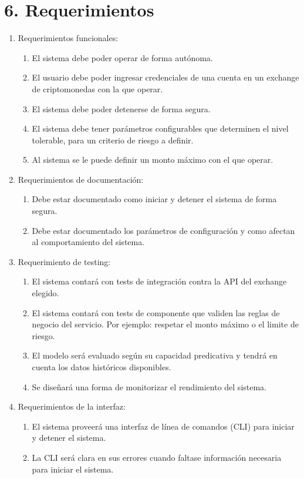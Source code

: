 \documentclass[
    11pt, %
]{charter}
\begin{document}
    \section{6. Requerimientos}
    \label{sec:requerimientos}

    \begin{enumerate}
    \item Requerimientos funcionales:
      \begin{enumerate}
      \item El sistema debe poder operar de forma autónoma.
      \item El usuario debe poder ingresar credenciales de una cuenta en un exchange de criptomonedas con la que operar.
      \item El sistema debe poder detenerse de forma segura.
      \item El sistema debe tener parámetros configurables que determinen el nivel tolerable, para un criterio de riesgo a definir.
      \item Al sistema se le puede definir un monto máximo con el que operar.
      \end{enumerate}
    \item Requerimientos de documentación:
      \begin{enumerate}
      \item Debe estar documentado como iniciar y detener el sistema de forma segura.
      \item Debe estar documentado los parámetros de configuración y como afectan al comportamiento del sistema.

      \end{enumerate}
    \item Requerimiento de testing:
      \begin{enumerate}
      \item El sistema contará con tests de integración contra la API del exchange elegido.
      \item El sistema contará con tests de componente que validen las reglas de negocio del servicio. Por ejemplo: respetar el monto máximo o el limite de riesgo.
      \item El modelo será evaluado según su capacidad predicativa y tendrá en cuenta los datos históricos disponibles.
      \item Se diseñará una forma de monitorizar el rendimiento del sistema.
      \end{enumerate}

    \item Requerimientos de la interfaz:
      \begin{enumerate}
      \item El sistema proveerá una interfaz de línea de comandos (CLI) para iniciar y detener el sistema.
      \item La CLI será clara en sus errores cuando faltase información necesaria para iniciar el sistema.
      \end{enumerate}

    \end{enumerate}
\end{document}
